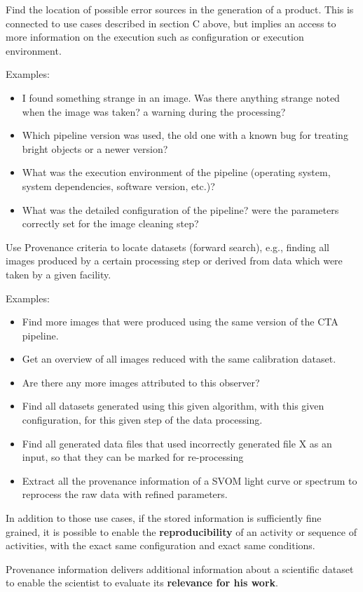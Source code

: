 Find the location of possible error sources in the generation of a product. This is connected to use cases described in section C above, but implies an access to more information on the execution such as configuration or execution environment.

        \noindent Examples:
        \begin{itemize}
            \item I found something strange in an image. Was there anything strange noted when the image was taken? a warning during the processing? 
            \item Which pipeline version was used, the old one with a known bug for treating bright objects or a newer version? 
            \item What was the execution environment of the pipeline (operating system, system dependencies, software version, etc.)?
            \item What was the detailed configuration of the pipeline? were the parameters correctly set for the image cleaning step?
        \end{itemize}


        Use Provenance criteria to locate datasets (forward search), e.g., finding all images produced by a certain processing step or derived from data which were taken by a given facility.
        
        \noindent Examples:
        \begin{itemize}
            \item Find more images that were produced using the same version of the CTA pipeline.
            \item Get an overview of all images reduced with the same calibration dataset.
            \item Are there any more images attributed to this observer?  
            \item Find all datasets generated using this given algorithm, with this given configuration, for this given step of the data processing.
            \item Find all generated data files that used incorrectly generated file X as an input, so that they can be marked for re-processing
            \item Extract all the provenance information of a SVOM light curve or spectrum to reprocess the raw data with refined parameters.
        \end{itemize}

In addition to those use cases, if the stored information is sufficiently fine grained, it is possible to enable the \textbf{reproducibility} of an activity or sequence of activities, with the exact same configuration and exact same conditions.

Provenance information delivers additional information about a scientific dataset to enable the scientist to evaluate its \textbf{relevance for his work}.
